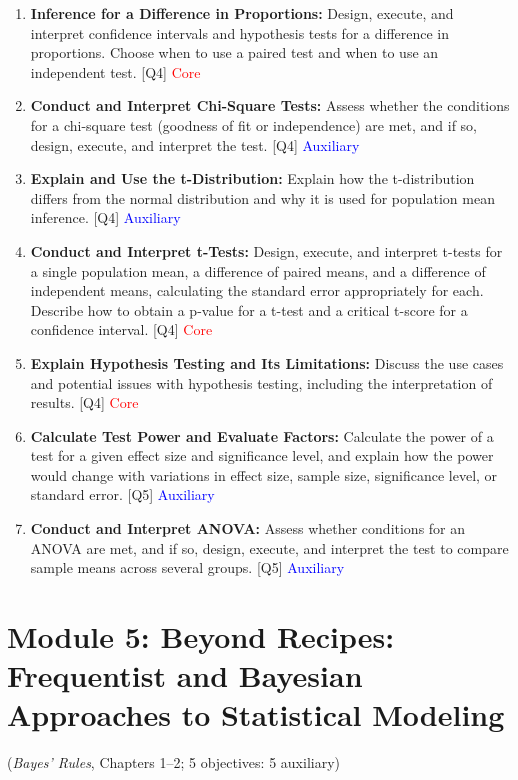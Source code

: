 \documentclass[12pt]{article}
\begin{document}
\begin{enumerate}
    \item \textbf{Inference for a Difference in Proportions:} Design, execute, and interpret confidence intervals and hypothesis tests for a difference in proportions. Choose when to use a paired test and when to use an independent test. [Q4] \textcolor{red}{Core}
    \item \textbf{Conduct and Interpret Chi-Square Tests:} Assess whether the conditions for a chi-square test (goodness of fit or independence) are met, and if so, design, execute, and interpret the test. [Q4] \textcolor{blue}{Auxiliary}
    \item \textbf{Explain and Use the t-Distribution:} Explain how the t-distribution differs from the normal distribution and why it is used for population mean inference. [Q4] \textcolor{blue}{Auxiliary}
    \item \textbf{Conduct and Interpret t-Tests:} Design, execute, and interpret t-tests for a single population mean, a difference of paired means, and a difference of independent means, calculating the standard error appropriately for each. Describe how to obtain a p-value for a t-test and a critical t-score for a confidence interval. [Q4] \textcolor{red}{Core}
    \item \textbf{Explain Hypothesis Testing and Its Limitations:} Discuss the use cases and potential issues with hypothesis testing, including the interpretation of results. [Q4] \textcolor{red}{Core}
    \item \textbf{Calculate Test Power and Evaluate Factors:} Calculate the power of a test for a given effect size and significance level, and explain how the power would change with variations in effect size, sample size, significance level, or standard error. [Q5] \textcolor{blue}{Auxiliary}
    \item \textbf{Conduct and Interpret ANOVA:} Assess whether conditions for an ANOVA are met, and if so, design, execute, and interpret the test to compare sample means across several groups. [Q5] \textcolor{blue}{Auxiliary} 
\end{enumerate}

\newpage


\section{Module 5: Beyond Recipes: Frequentist and Bayesian Approaches to Statistical Modeling}
(\textit{Bayes' Rules}, Chapters 1--2; 5 objectives: 5 auxiliary)
\end{document}
